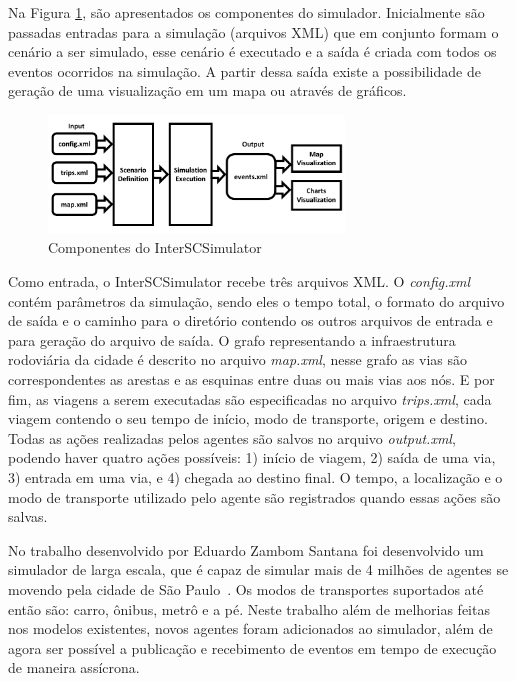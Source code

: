 Na Figura \ref{fig:simulator_components}, são apresentados os componentes do simulador.
Inicialmente são passadas entradas para a simulação (arquivos XML) que em conjunto formam o cenário a ser simulado, esse cenário é executado e a
saída é criada com todos os eventos ocorridos na simulação.
A partir dessa saída existe a possibilidade de geração de uma visualização em um mapa ou através de gráficos.

\begin{figure}[ht]
	\centering
	\includegraphics[width=0.7\textwidth]{figuras/Components.pdf}
	\caption{Componentes do InterSCSimulator}
	\label{fig:simulator_components}
\end{figure}

Como entrada, o InterSCSimulator recebe três arquivos XML. O \textit{config.xml} contém parâmetros da simulação, sendo eles o tempo total, o formato do
arquivo de saída e o caminho para o diretório contendo os outros arquivos de entrada e para geração do arquivo de saída.
O grafo representando a infraestrutura rodoviária da cidade é descrito no arquivo \textit{map.xml}, nesse grafo as vias são correspondentes as arestas e as esquinas entre
duas ou mais vias aos nós.
E por fim, as viagens a serem executadas são especificadas no arquivo \textit{trips.xml}, cada viagem contendo o seu tempo de início, modo de transporte, origem e destino.
Todas as ações realizadas pelos agentes são salvos no arquivo \textit{output.xml}, podendo haver quatro ações possíveis: 1) início de viagem, 2) saída de uma via,
3) entrada em uma via, e 4) chegada ao destino final.
O tempo, a localização e o modo de transporte utilizado pelo agente são registrados quando essas ações são salvas.

No trabalho desenvolvido por Eduardo Zambom Santana foi desenvolvido um simulador de larga escala, que é capaz de simular mais de 4 milhões de
agentes se movendo pela cidade de São Paulo~\cite{santana_17}.
Os modos de transportes suportados até então são: carro, ônibus, metrô e a pé.
Neste trabalho além de melhorias feitas nos modelos existentes, novos agentes foram adicionados ao simulador, além de agora ser possível a publicação e recebimento de
eventos em tempo de execução de maneira assícrona.

